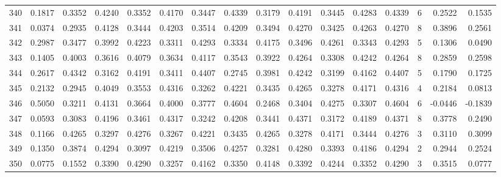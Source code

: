 \begin{tabular}{lrrrrrrrrrrrrrrr}
340 &      0.1817 &  0.3352 &  0.4240 &  0.3352 &  0.4170 &  0.3447 &  0.4339 &  0.3179 &  0.4191 &  0.3445 &   0.4283 &     0.4339 &      6 &                    0.2522 &                     0.1535 \\
341 &      0.0374 &  0.2935 &  0.4128 &  0.3444 &  0.4203 &  0.3514 &  0.4209 &  0.3494 &  0.4270 &  0.3425 &   0.4263 &     0.4270 &      8 &                    0.3896 &                     0.2561 \\
342 &      0.2987 &  0.3477 &  0.3992 &  0.4223 &  0.3311 &  0.4293 &  0.3334 &  0.4175 &  0.3496 &  0.4261 &   0.3343 &     0.4293 &      5 &                    0.1306 &                     0.0490 \\
343 &      0.1405 &  0.4003 &  0.3616 &  0.4079 &  0.3634 &  0.4117 &  0.3543 &  0.3922 &  0.4264 &  0.3308 &   0.4242 &     0.4264 &      8 &                    0.2859 &                     0.2598 \\
344 &      0.2617 &  0.4342 &  0.3162 &  0.4191 &  0.3411 &  0.4407 &  0.2745 &  0.3981 &  0.4242 &  0.3199 &   0.4162 &     0.4407 &      5 &                    0.1790 &                     0.1725 \\
345 &      0.2132 &  0.2945 &  0.4049 &  0.3553 &  0.4316 &  0.3262 &  0.4221 &  0.3435 &  0.4265 &  0.3278 &   0.4171 &     0.4316 &      4 &                    0.2184 &                     0.0813 \\
346 &      0.5050 &  0.3211 &  0.4131 &  0.3664 &  0.4000 &  0.3777 &  0.4604 &  0.2468 &  0.3404 &  0.4275 &   0.3307 &     0.4604 &      6 &                   -0.0446 &                    -0.1839 \\
347 &      0.0593 &  0.3083 &  0.4196 &  0.3461 &  0.4317 &  0.3242 &  0.4208 &  0.3441 &  0.4371 &  0.3172 &   0.4189 &     0.4371 &      8 &                    0.3778 &                     0.2490 \\
348 &      0.1166 &  0.4265 &  0.3297 &  0.4276 &  0.3267 &  0.4221 &  0.3435 &  0.4265 &  0.3278 &  0.4171 &   0.3444 &     0.4276 &      3 &                    0.3110 &                     0.3099 \\
349 &      0.1350 &  0.3874 &  0.4294 &  0.3097 &  0.4219 &  0.3506 &  0.4257 &  0.3281 &  0.4280 &  0.3393 &   0.4186 &     0.4294 &      2 &                    0.2944 &                     0.2524 \\
350 &      0.0775 &  0.1552 &  0.3390 &  0.4290 &  0.3257 &  0.4162 &  0.3350 &  0.4148 &  0.3392 &  0.4244 &   0.3352 &     0.4290 &      3 &                    0.3515 &                     0.0777 \\

\end{tabular}
